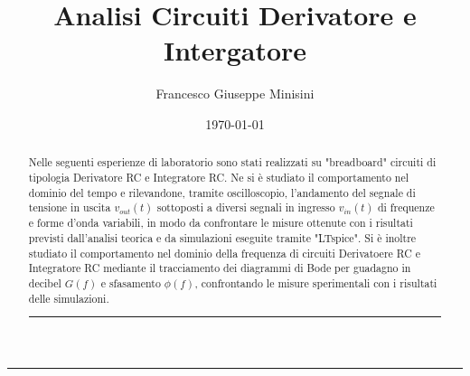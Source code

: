 \documentclass[a4paper,12pt]{article}
\title{Analisi Circuiti Derivatore e Intergatore}
\author{Francesco Giuseppe Minisini}
\date{\today}
\begin{document}
\maketitle
\hrule
\vspace{9pt}
\begin{abstract}
    Nelle seguenti esperienze di laboratorio sono stati realizzati su "breadboard" circuiti di tipologia Derivatore RC e Integratore RC. Ne si è studiato il comportamento nel dominio del tempo e rilevandone, tramite oscilloscopio, l'andamento del segnale di tensione in uscita $v_{out}(t)$ sottoposti a diversi segnali in ingresso $v_{in}(t)$ di frequenze e forme d'onda variabili, in modo da confrontare le misure ottenute con i risultati previsti dall'analisi teorica e da simulazioni eseguite tramite "LTspice". Si è inoltre studiato il comportamento nel dominio della frequenza di circuiti Derivatoere RC e Integratore RC mediante il tracciamento dei diagrammi di Bode per guadagno in decibel $G(f)$ e sfasamento $\phi(f)$, confrontando le misure sperimentali con i risultati delle simulazioni.
\vspace{20 pt}
\hrule
\end{abstract}
\vspace{2 pt}



\end{document}
